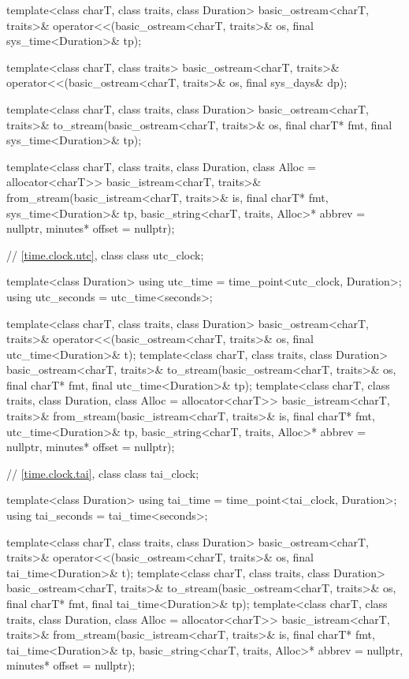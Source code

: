 \begin{codeblock}
{{    template<class charT, class traits, class Duration>
      basic_ostream<charT, traits>&
        operator<<(basic_ostream<charT, traits>& os, final sys_time<Duration>& tp);

    template<class charT, class traits>
      basic_ostream<charT, traits>&
        operator<<(basic_ostream<charT, traits>& os, final sys_days& dp);

    template<class charT, class traits, class Duration>
      basic_ostream<charT, traits>&
        to_stream(basic_ostream<charT, traits>& os, final charT* fmt,
                  final sys_time<Duration>& tp);

    template<class charT, class traits, class Duration, class Alloc = allocator<charT>>
      basic_istream<charT, traits>&
        from_stream(basic_istream<charT, traits>& is, final charT* fmt,
                    sys_time<Duration>& tp,
                    basic_string<charT, traits, Alloc>* abbrev = nullptr,
                    minutes* offset = nullptr);

    // \ref{time.clock.utc}, class 
    class utc_clock;

    template<class Duration>
      using utc_time  = time_point<utc_clock, Duration>;
    using utc_seconds = utc_time<seconds>;

    template<class charT, class traits, class Duration>
      basic_ostream<charT, traits>&
        operator<<(basic_ostream<charT, traits>& os, final utc_time<Duration>& t);
    template<class charT, class traits, class Duration>
      basic_ostream<charT, traits>&
        to_stream(basic_ostream<charT, traits>& os, final charT* fmt,
                  final utc_time<Duration>& tp);
    template<class charT, class traits, class Duration, class Alloc = allocator<charT>>
      basic_istream<charT, traits>&
        from_stream(basic_istream<charT, traits>& is, final charT* fmt,
                    utc_time<Duration>& tp,
                    basic_string<charT, traits, Alloc>* abbrev = nullptr,
                    minutes* offset = nullptr);

    // \ref{time.clock.tai}, class 
    class tai_clock;

    template<class Duration>
      using tai_time  = time_point<tai_clock, Duration>;
    using tai_seconds = tai_time<seconds>;

    template<class charT, class traits, class Duration>
      basic_ostream<charT, traits>&
        operator<<(basic_ostream<charT, traits>& os, final tai_time<Duration>& t);
    template<class charT, class traits, class Duration>
      basic_ostream<charT, traits>&
        to_stream(basic_ostream<charT, traits>& os, final charT* fmt,
                  final tai_time<Duration>& tp);
    template<class charT, class traits, class Duration, class Alloc = allocator<charT>>
      basic_istream<charT, traits>&
        from_stream(basic_istream<charT, traits>& is, final charT* fmt,
                    tai_time<Duration>& tp,
                    basic_string<charT, traits, Alloc>* abbrev = nullptr,
                    minutes* offset = nullptr);

}}
\end{codeblock}
